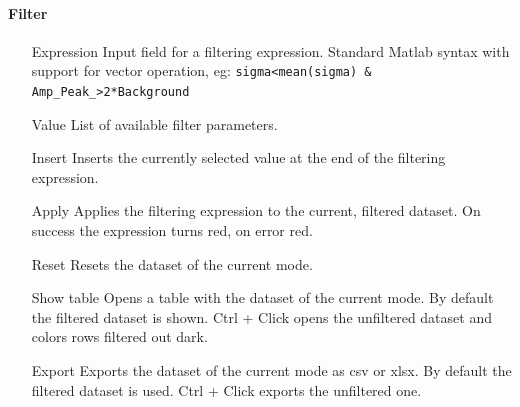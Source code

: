 \documentclass[11pt,onside]{report}
\numberwithin{equation}{chapter}
\begin{document}
\paragraph{Filter}
\begin{itemize}[leftmargin=3cm]
	\item[\textsf{Expression}] Input field for a filtering expression. Standard Matlab syntax with support for vector operation, eg: \texttt{sigma<mean(sigma) \& Amp\_Peak\_>2*Background} 
	\item[\textsf{Value}] List of available filter parameters.
	\item[\textsf{Insert}] Inserts the currently selected value at the end of the filtering expression.
	\item[\textsf{Apply}] Applies the filtering expression to the current, filtered dataset. On success the expression turns red, on error red.
	\item[\textsf{Reset}] Resets the dataset of the current mode.
	\item[\textsf{Show table}] Opens a table with the dataset of the current mode. By default the filtered dataset is shown. \textsf{Ctrl} + Click opens the unfiltered dataset and colors rows filtered out dark.
	\item[\textsf{Export}] Exports the dataset of the current mode as \textsf{csv} or \textsf{xlsx}. By default the filtered dataset is used. \textsf{Ctrl} + Click exports the unfiltered one.
\end{itemize}
\end{document}
